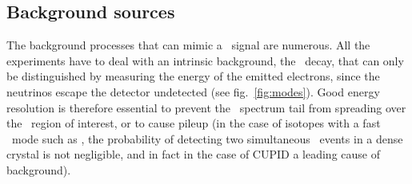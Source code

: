 %

\subsection{Background sources} \label{subsec:bgrsources}
The background processes that can mimic a \bbonu\ signal 
are numerous. All the experiments have to deal with an intrinsic background, the \bbtnu\ decay, that can only be distinguished by measuring the energy of the emitted electrons, since the neutrinos escape the detector undetected (see fig.~\ref{fig:modes}). Good energy resolution is therefore essential to prevent the \bbtnu\ spectrum tail from spreading over the \bbonu\ region of interest, or to cause pileup (in the case of isotopes with a fast \bbtnu\ mode such as , the probability of detecting two simultaneous \bbtnu\ events in a dense crystal is not negligible, and in fact in the case of CUPID a leading cause of background).    

